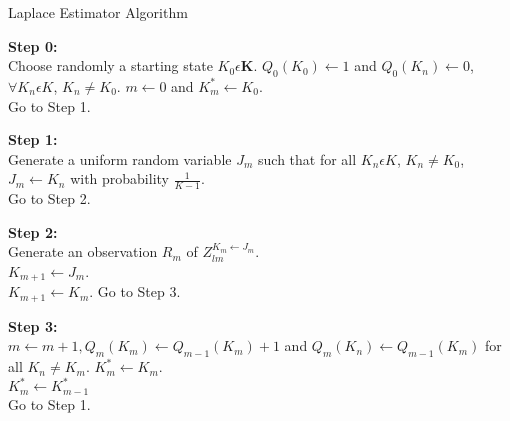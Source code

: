 \begin{algorithm} [H]  						                 			%
\caption{Laplace Estimator Algorithm \cite{ioannis_laplace}}          	%
\label{alg:laplace}                         						  	%
\begin{algorithmic}                    									%
    \item [\textbf{Step 0:}] \\
    		Choose randomly a starting state $K_0 \epsilon \textbf{K}$.
    		\hspace{1.5em} \State $Q_0(K_0) \gets 1 $ and $Q_0(K_n) \gets 0 $, $\forall K_n  \epsilon K$, $K_n \neq K_0$.
    		\hspace{1.5em} \State $m \gets 0$ and \State $K^{*}_m \gets K_0$.\\
    		Go to Step 1.
    \item[\textbf{Step 1:}] \\
    		Generate a uniform random variable $J_m$ such that for all $K_n \epsilon K$, $K_n \neq K_0$, $J_m \gets K_n$ with probability $\frac{1}{K-1}$. \\
    		Go to Step 2.
    \item[\textbf{Step 2:}] \\
    		Generate an observation $R_m$ of $Z_{lm}^{K_m \gets J_m}$.
    	 \\
    		\hspace{1.5em} $K_{m+1} \gets J_m$.
    	\Else \\
    		\hspace{1.5em} $K_{m+1} \gets K_m$.
    	\EndIf \hspace{1.5em} Go to Step 3.
    \item[\textbf{Step 3:}] \\
    		$m \gets m + 1, Q_m(K_m) \gets Q_{m-1}(K_m) + 1$ and $Q_m(K_n) \gets Q_{m-1}(K_m)$ for all $K_n \neq K_m$.
	    		\hspace{1.5em} $K_m^{*} \gets K_m$.
    		\Else \\
    			\hspace{1.5em} $K_m^{*} \gets K_{m-1}^{*}$
    		\EndIf \hspace{1.5em}\\
    		Go to Step 1.
\end{algorithmic}
\end{algorithm}

